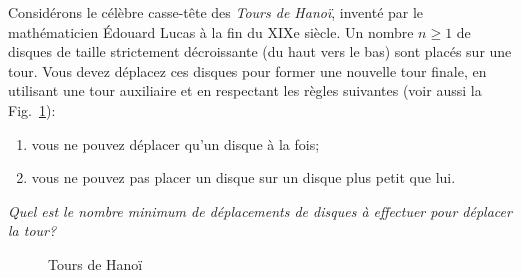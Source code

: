 \documentclass[french,course,oneside,theoremnosection]{lecture}
\begin{document}
\begin{example}
Considérons le célèbre casse-tête des \emph{Tours de Hanoï}, inventé par le mathématicien Édouard Lucas à la fin du XIXe siècle. Un nombre $n \geq 1$ de disques de taille strictement décroissante (du haut vers le bas) sont placés sur une tour. Vous devez déplacez ces disques pour former une nouvelle tour finale, en utilisant une tour auxiliaire et en respectant les règles suivantes (voir aussi la Fig.~\ref{fig:han}):
\begin{enumerate}
\item vous ne pouvez déplacer qu'un disque à la fois;
\item vous ne pouvez pas placer un disque sur un disque plus petit que lui.
\end{enumerate}

\emph{Quel est le nombre minimum  de déplacements de disques à effectuer pour déplacer la tour?}
\begin{figure}\centering
{}\caption{Tours de Hanoï}\label{fig:han}
\end{figure}
\end{example}
\end{document}
